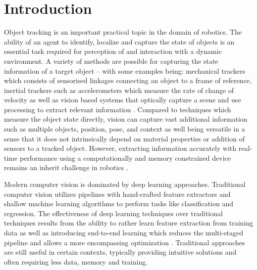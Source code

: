 \documentclass[a4paper,twoside,12pt]{report}
\begin{document}
\listoffigures
\newpage
{}
{}

\listoftables
\newpage
{}

\chapter{Introduction}

Object tracking is an important practical topic in the domain of robotics. The ability of an agent to identify, localize and capture the state of objects is an essential task required for perception of and interaction with a dynamic environment. A variety of methods are possible for capturing the state information of a target object -- with some examples being: mechanical trackers which consists of sensorised linkages connecting an object to a frame of reference, inertial trackers such as accelerometers which measure the rate of change of velocity as well as vision based systems that optically capture a scene and use processing to extract relevant information \citep{track2}. Compared to techniques which measure the object state directly, vision can capture vast additional information such as multiple objects, position, pose,  and context as well being versatile in a sense that it does not intrinsically depend on material properties or addition of sensors to a tracked object. However, extracting information accurately with real-time performance using a computationally and memory constrained device remains an inherit challenge in robotics \citep{quantization, kalmannet}. 

Modern computer vision is dominated by deep learning approaches. Traditional computer vision utilizes pipelines with hand-crafted feature extractors and shallow machine learning algorithms to perform  tasks like classification and regression. The effectiveness of deep learning techniques over traditional techniques results from the ability to rather learn feature extraction from training data as well as introducing end-to-end learning which reduces the multi-staged pipeline and allows a more encompassing optimization \citep{tradvmod}. Traditional approaches are still useful in certain contexts, typically providing intuitive solutions and often requiring less data, memory and training.
\end{document}
